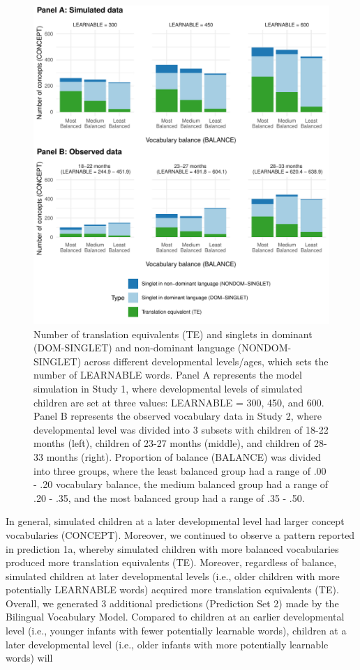 \documentclass[
  english,
  ,man,floatsintext]{apa6}
\begin{document}
\begin{figure}[H]

{\centering \includegraphics[width=0.8\linewidth,height=0.8\textheight]{paper_TE_bilingual_vocabulary_model_files/figure-latex/fig3-1} 

}

\caption{Number of translation equivalents (TE) and singlets in dominant (DOM-SINGLET) and non-dominant language (NONDOM-SINGLET) across different developmental levels/ages, which sets the number of LEARNABLE words. Panel A represents the model simulation in Study 1, where developmental levels of simulated children are set at three values: LEARNABLE = 300, 450, and 600. Panel B represents the observed vocabulary data in Study 2, where developmental level was divided into 3 subsets with children of 18-22 months (left), children of 23-27 months (middle), and children of 28-33 months (right). Proportion of balance (BALANCE) was divided into three groups, where the least balanced group had a range of .00 - .20 vocabulary balance, the medium balanced group had a range of .20 - .35, and the most balanced group had a range of .35 - .50.}\label{fig:fig3}
\end{figure}

In general, simulated children at a later developmental level had larger concept vocabularies (CONCEPT). Moreover, we continued to observe a pattern reported in prediction 1a, whereby simulated children with more balanced vocabularies produced more translation equivalents (TE). Moreover, regardless of balance, simulated children at later developmental levels (i.e., older children with more potentially LEARNABLE words) acquired more translation equivalents (TE). Overall, we generated 3 additional predictions (Prediction Set 2) made by the Bilingual Vocabulary Model. Compared to children at an earlier developmental level (i.e., younger infants with fewer potentially learnable words), children at a later developmental level (i.e., older infants with more potentially learnable words) will
\end{document}
